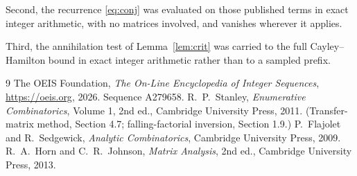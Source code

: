 \documentclass[11pt,a4paper]{article}
\theoremstyle{plain}
\theoremstyle{definition}
\begin{document}
Second, the recurrence \eqref{eq:conj} was evaluated on those published terms in exact
integer arithmetic, with no matrices involved, and vanishes wherever it applies.

Third, the annihilation test of Lemma~\ref{lem:crit} was carried to the full
Cayley--Hamilton bound in exact integer arithmetic rather than to a sampled prefix.

\begin{thebibliography}{9}
 The OEIS Foundation, \emph{The On-Line Encyclopedia of Integer
Sequences}, \url{https://oeis.org}, 2026. Sequence A279658.
 R.~P.~Stanley, \emph{Enumerative Combinatorics}, Volume 1, 2nd ed.,
Cambridge University Press, 2011. (Transfer-matrix method, Section 4.7; falling-factorial
inversion, Section 1.9.)
 P.~Flajolet and R.~Sedgewick, \emph{Analytic Combinatorics}, Cambridge
University Press, 2009.
 R.~A.~Horn and C.~R.~Johnson, \emph{Matrix Analysis}, 2nd ed., Cambridge
University Press, 2013.
\end{thebibliography}
\end{document}
